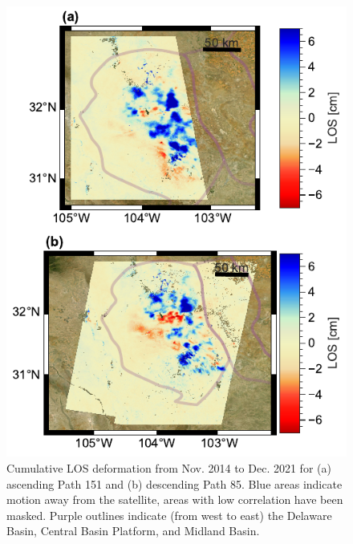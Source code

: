 \begin{figure}
	\centering
	\includegraphics[width=.9\textwidth]{figures/chapter5-lowess/figure-results-los-paths-85-151.pdf}
	\caption[Cumulative 7-year LOS deformation for Paths 85 and 151]{
		Cumulative LOS deformation from Nov. 2014 to Dec. 2021 for (a) ascending Path 151 and (b) descending Path 85.  Blue areas indicate motion away from the satellite, areas with low correlation have been masked.
		Purple outlines indicate (from west to east) the Delaware Basin, Central Basin Platform, and Midland Basin.
	}
	\label{fig:ch5-results-los-paths-85-151}
\end{figure}



\FloatBarrier

